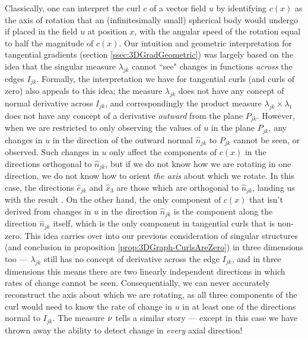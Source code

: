Classically, one can interpret the curl $c$ of a vector field $u$ by identifying $c(x)$ as the axis of rotation that an (infinitesimally small) spherical body would undergo if placed in the field $u$ at position $x$, with the angular speed of the rotation equal to half the magnitude of $c(x)$.
Our intuition and geometric interpretation for tangential gradients (section \ref{ssec:3DGradGeometric}) was largely based on the idea that the singular measure $\lambda_{jk}$ cannot ``see" changes in functions \emph{across} the edges $I_{jk}$.
Formally, the interpretation we have for tangential curls (and curls of zero) also appeals to this idea; the measure $\lambda_{jk}$ does not have any concept of normal derivative across $I_{jk}$, and correspondingly the product measure $\lambda_{jk}\times\lambda_1$ does not have any concept of a derivative \emph{outward} from the plane $P_{jk}$.
However, when we are restricted to only observing the values of $u$ in the plane $P_{jk}$, any changes in $u$ in the direction of the outward normal $\widehat{n}_{jk}$ to $P_{jk}$ cannot be seen, or observed.
Such changes in $u$ only affect the components of $c(x)$ in the directions orthogonal to $\widehat{n}_{jk}$, but if we do not know how we are rotating in one direction, we do not know how to orient \emph{the axis} about which we rotate.
In this case, the directions $\widehat{e}_{jk}$ and $\widehat{x}_3$ are those which are orthogonal to $\widehat{n}_{jk}$, landing us with the result .
On the other hand, the only component of $c(x)$ that isn't derived from changes in $u$ in the direction $\widehat{n}_{jk}$ is the component along the direction $\widehat{n}_{jk}$ itself, which is the only component in tangential curls that is non-zero. 
This idea carries over into our previous consideration of singular structures (and conclusion in proposition \ref{prop:3DGraph-CurlsAreZero}) in three dimensions too ---  $\lambda_{jk}$ still has no concept of derivative across the edge $I_{jk}$, and in three dimensions this means there are two linearly independent directions in which rates of change cannot be seen.
Consequentially, we can never accurately reconstruct the axis about which we are rotating, as all three components of the curl would need to know the rate of change in $u$ in at least one of the directions normal to $I_{jk}$.
The measure $\nu$ tells a similar story --- except in this case we have thrown away the ability to detect change in \emph{every} axial direction!

